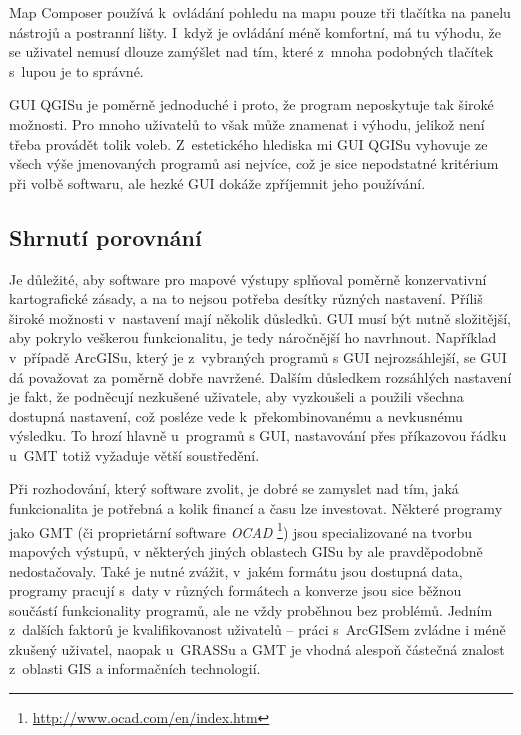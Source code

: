 \documentclass[a4paper,12pt,draft]{article}
\begin{document}
Map Composer používá k~ovládání pohledu na mapu pouze tři tlačítka
na panelu nástrojů a postranní lišty. I~když je ovládání méně
komfortní, má tu výhodu, že se uživatel nemusí dlouze zamýšlet nad
tím, které z~mnoha podobných tlačítek s~lupou je to správné.

GUI QGISu je poměrně jednoduché i proto, že program
neposkytuje tak široké možnosti. Pro mnoho uživatelů to však
může znamenat i výhodu, jelikož není třeba provádět tolik voleb.
Z~estetického hlediska mi GUI QGISu vyhovuje ze všech výše
jmenovaných programů asi nejvíce, což je sice nepodstatné kritérium
při volbě softwaru, ale hezké GUI dokáže zpříjemnit jeho
používání.

\subsection{Shrnutí porovnání}
Je důležité, aby software pro mapové výstupy splňoval poměrně
konzervativní kartografické zásady, a na to nejsou potřeba
desítky různých nastavení. Příliš široké možnosti v~nastavení
mají několik důsledků. GUI musí být nutně
složitější, aby pokrylo veškerou funkcionalitu, je tedy náročnější
ho navrhnout. Například v~případě ArcGISu, který je z~vybraných programů s
GUI nejrozsáhlejší, se GUI dá považovat za poměrně dobře
navržené. 
Dalším důsledkem rozsáhlých nastavení je fakt, že podněcují nezkušené uživatele,
aby vyzkoušeli a použili všechna dostupná nastavení, což posléze vede
k~překombinovanému a nevkusnému výsledku. To hrozí hlavně u~programů s
GUI, nastavování přes příkazovou řádku u~GMT totiž vyžaduje
větší soustředění.

Při rozhodování, který software zvolit, je dobré se zamyslet nad tím, jaká
funkcionalita je potřebná a kolik financí a času lze investovat. Některé
programy jako GMT (či proprietární software \emph{OCAD}%
\footnote{\url{http://www.ocad.com/en/index.htm}})
jsou specializované na tvorbu mapových výstupů, v
některých jiných oblastech GISu by ale pravděpodobně nedostačovaly. Také je
nutné zvážit, v~jakém formátu jsou dostupná data, programy pracují s~daty v
různých formátech a konverze jsou sice běžnou součástí funkcionality programů,
ale ne vždy proběhnou bez problémů. Jedním z~dalších faktorů je kvalifikovanost
uživatelů -- práci s~ArcGISem zvládne i méně zkušený uživatel, naopak u~GRASSu
a GMT je vhodná alespoň částečná znalost z~oblasti GIS a informačních
technologií.
\end{document}
